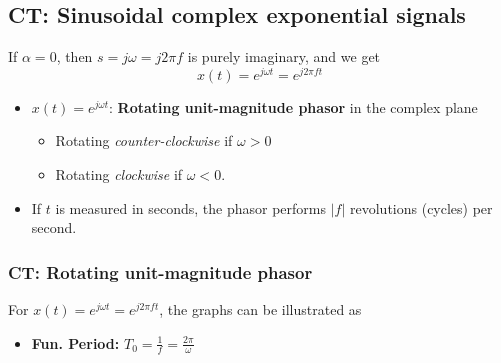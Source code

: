 \subsection{CT: Sinusoidal complex exponential signals}
\begin{definition}
    If \(\alpha = 0\), then \(s = j\omega = j 2\pi f\) is purely imaginary, and we get
        \begin{equation}
            x(t) = e^{j\omega t} = e^{j 2 \pi f t}
        \end{equation}
    \begin{itemize}
        \item \(x(t) = e^{j\omega t}\): \textbf{Rotating unit-magnitude phasor} in the complex plane
        \begin{itemize}
            \item Rotating \textit{counter-clockwise} if \(\omega > 0\) 
            \item Rotating \textit{clockwise} if \(\omega < 0\).
        \end{itemize}
        \item If \(t\) is measured in seconds, the phasor performs \(|f|\) revolutions (cycles) per second.        
    \end{itemize}
\end{definition}

    \subsubsection{CT: Rotating unit-magnitude phasor}
    \begin{definition}

        For $x(t) = e^{j\omega t} = e^{j 2 \pi f t}$, the graphs can be illustrated as
        \begin{itemize}
            \item \textbf{Fun. Period:} $T_0 = \frac{1}{f} = \frac{2\pi}{\omega}$
        \end{itemize}

    \end{definition}

